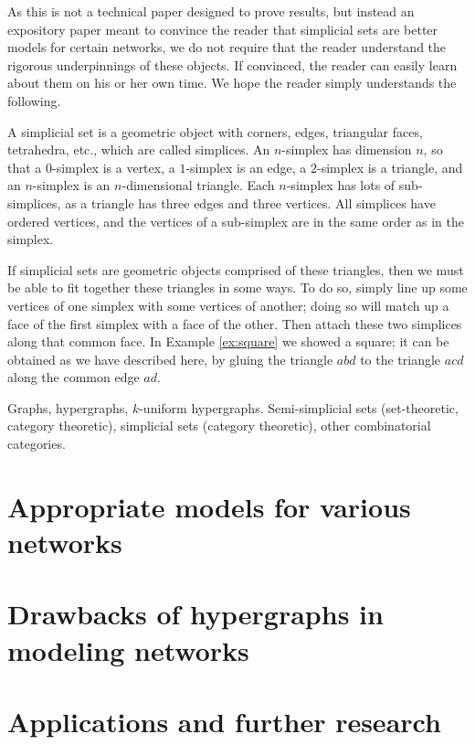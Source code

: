 \documentclass{amsart}
\begin{document}
\begin{remark}\label{rem:all you need to know}

As this is not a technical paper designed to prove results, but instead an expository paper meant to convince the reader that simplicial sets are better models for certain networks, we do not require that the reader understand the rigorous underpinnings of these objects.  If convinced, the reader can easily learn about them on his or her own time.  We hope the reader simply understands the following.

A simplicial set is a geometric object with corners, edges, triangular faces, tetrahedra, etc., which are called simplices.  An $n$-simplex has dimension $n$, so that a $0$-simplex is a vertex, a $1$-simplex is an edge, a $2$-simplex is a triangle, and an $n$-simplex is an $n$-dimensional triangle.  Each $n$-simplex has lots of sub-simplices, as a triangle has three edges and three vertices.  All simplices have ordered vertices, and the vertices of a sub-simplex are in the same order as in the simplex.

If simplicial sets are geometric objects comprised of these triangles, then we must be able to fit together these triangles in some ways.  To do so, simply line up some vertices of one simplex with some vertices of another; doing so will match up a face of the first simplex with a face of the other.  Then attach these two simplices along that common face.  In Example \ref{ex:square} we showed a square; it can be obtained as we have described here, by gluing the triangle $abd$ to the triangle $acd$ along the common edge $ad$.

\end{remark}




Graphs, hypergraphs, $k$-uniform hypergraphs.  Semi-simplicial sets (set-theoretic, category theoretic), simplicial sets (category theoretic), other combinatorial categories.

\section{Appropriate models for various networks}

\section{Drawbacks of hypergraphs in modeling networks}\label{sec:drawbacks}

\section{Applications and further research}\label{sec:applications}
\end{document}
